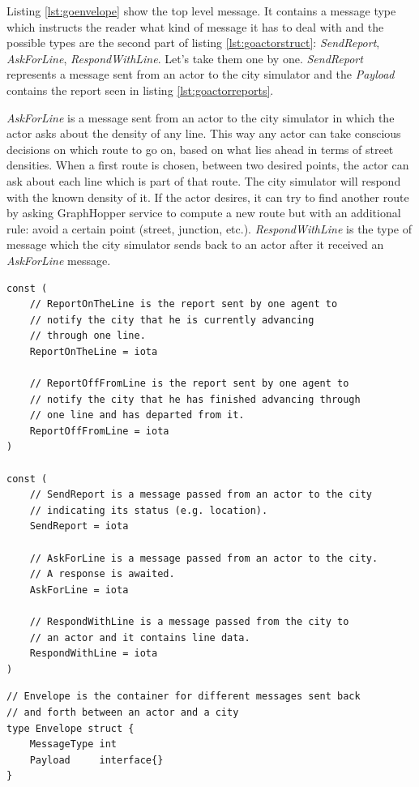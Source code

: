 \documentclass[conference]{IEEEtran}
\begin{document}
Listing \ref{lst:goenvelope} show the top level message. It contains a message type which instructs the reader what kind of message it has to deal with and the possible types are the second part of listing \ref{lst:goactorstruct}: \textit{SendReport}, \textit{AskForLine}, \textit{RespondWithLine}. Let's take them one by one. \textit{SendReport} represents a message sent from an actor to the city simulator and the \textit{Payload} contains the report seen in listing \ref{lst:goactorreports}. 

\textit{AskForLine} is a message sent from an actor to the city simulator in which the actor asks about the density of any line. This way any actor can take conscious decisions on which route to go on, based on what lies ahead in terms of street densities. When a first route is chosen, between two desired points, the actor can ask about each line which is part of that route. The city simulator will respond with the known density of it. If the actor desires, it can try to find another route by asking GraphHopper service to compute a new route but with an additional rule: avoid a certain point (street, junction, etc.). \textit{RespondWithLine} is the type of message which the city simulator sends back to an actor after it received an \textit{AskForLine} message.

\begin{lstlisting}[caption=Go enumerations for messaging, label=lst:goactorreports]
const (   
    // ReportOnTheLine is the report sent by one agent to
    // notify the city that he is currently advancing
    // through one line.
    ReportOnTheLine = iota
    
    // ReportOffFromLine is the report sent by one agent to
    // notify the city that he has finished advancing through
    // one line and has departed from it.
    ReportOffFromLine = iota
)
    
const (
    // SendReport is a message passed from an actor to the city
    // indicating its status (e.g. location).
    SendReport = iota
    
    // AskForLine is a message passed from an actor to the city.
    // A response is awaited.
    AskForLine = iota
    
    // RespondWithLine is a message passed from the city to
    // an actor and it contains line data.
    RespondWithLine = iota
)
\end{lstlisting}

\begin{lstlisting}[caption=Go top level struct (envelope), label=lst:goenvelope]
// Envelope is the container for different messages sent back
// and forth between an actor and a city
type Envelope struct {
    MessageType int
    Payload     interface{}
}
\end{lstlisting}
\end{document}
